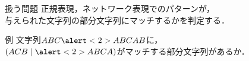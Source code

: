 \documentclass[dvipdfmx,12pt,beamer]{standalone}
\begin{document}
\begin{frame}{扱う問題}
  正規表現，ネットワーク表現でのパターンが，\\与えられた文字列の部分文字列にマッチするかを判定する．

  \begin{block}{例}
    文字列$ABC\alert<2>{ABCA}B$に，\\ 
    $(ACB\mid \alert<2>{ABCA})$がマッチする部分文字列があるか．\\
  \end{block}
\end{frame}
\end{document}
